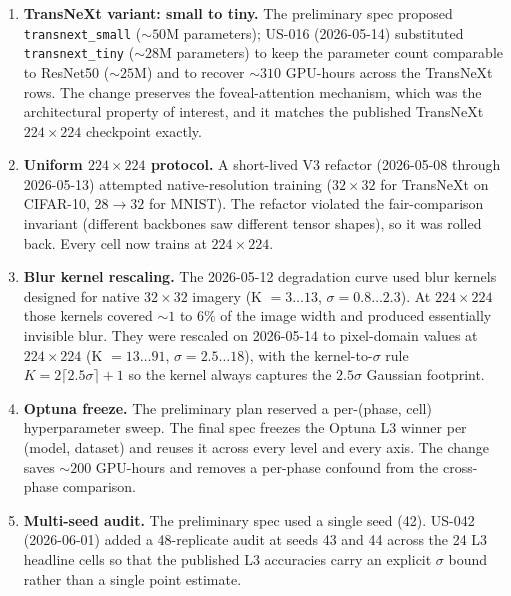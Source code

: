 \begin{enumerate}
  \item \textbf{TransNeXt variant: small to tiny.} The preliminary spec
        proposed \texttt{transnext\_small} ($\sim 50$M parameters); US-016
        (2026-05-14) substituted \texttt{transnext\_tiny} ($\sim 28$M
        parameters) to keep the parameter count comparable to ResNet50
        ($\sim 25$M) and to recover $\sim 310$ GPU-hours across the
        TransNeXt rows. The change preserves the foveal-attention
        mechanism, which was the architectural property of interest, and it
        matches the published TransNeXt $224 \times 224$ checkpoint exactly.
  \item \textbf{Uniform $224 \times 224$ protocol.} A short-lived V3
        refactor (2026-05-08 through 2026-05-13) attempted native-resolution
        training ($32 \times 32$ for TransNeXt on CIFAR-10, $28 \rightarrow 32$
        for MNIST). The refactor violated the fair-comparison invariant
        (different backbones saw different tensor shapes), so it was rolled
        back. Every cell now trains at $224 \times 224$.
  \item \textbf{Blur kernel rescaling.} The 2026-05-12 degradation curve
        used blur kernels designed for native $32 \times 32$ imagery
        (K $= 3 \ldots 13$, $\sigma = 0.8 \ldots 2.3$). At $224 \times 224$
        those kernels covered $\sim 1$ to $6 \%$ of the image width and
        produced essentially invisible blur. They were rescaled on
        2026-05-14 to pixel-domain values at $224 \times 224$ (K $= 13 \ldots 91$,
        $\sigma = 2.5 \ldots 18$), with the kernel-to-$\sigma$ rule
        $K = 2 \lceil 2.5 \sigma \rceil + 1$ so the kernel always captures the
        $2.5 \sigma$ Gaussian footprint.
  \item \textbf{Optuna freeze.} The preliminary plan reserved a per-(phase,
        cell) hyperparameter sweep. The final spec freezes the Optuna L3
        winner per (model, dataset) and reuses it across every level and
        every axis. The change saves $\sim 200$ GPU-hours and removes a
        per-phase confound from the cross-phase comparison.
  \item \textbf{Multi-seed audit.} The preliminary spec used a single seed
        (42). US-042 (2026-06-01) added a 48-replicate audit at seeds 43
        and 44 across the 24 L3 headline cells so that the published L3
        accuracies carry an explicit $\sigma$ bound rather than a single
        point estimate.
\end{enumerate}

